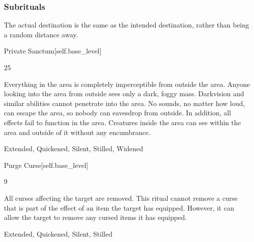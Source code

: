 \subsubsection{Subrituals}
The actual destination is the same as the intended destination, rather than being a random distance away.
\begin{spellsection}{Private Sanctum}[self.base_level]
\begin{spellcontent}
\begin{spelltargetinginfo}
 25
\end{spelltargetinginfo}
\begin{spelleffects}
\spelleffect
Everything in the area is completely imperceptible from outside the area.
Anyone looking into the area from outside sees only a dark, foggy mass.
Darkvision and similar abilities cannot penetrate into the area.
No sounds, no matter how loud, can escape the area, so nobody can eavesdrop from outside.
In addition, all  effects fail to function in the area.
Creatures inside the area can see within the area and outside of it without any encumbrance.
\end{spelleffects}
\end{spellcontent}
\begin{spellfooter}
 Extended, Quickened, Silent, Stilled, Widened
\end{spellfooter}
\begin{spellsubcontent}
\end{spellsubcontent}
\end{spellsection}
\begin{spellsection}{Purge Curse}[self.base_level]
\begin{spellcontent}
\begin{spelltargetinginfo}
 9
\end{spelltargetinginfo}
\begin{spelleffects}
\spelleffect
All curses affecting the target are removed.
This ritual cannot remove a curse that is part of the effect of an item the target has equipped.
However, it can allow the target to remove any cursed items it has equipped.
\end{spelleffects}
\end{spellcontent}
\begin{spellfooter}
 Extended, Quickened, Silent, Stilled
\end{spellfooter}
\begin{spellsubcontent}
\end{spellsubcontent}
\end{spellsection}
